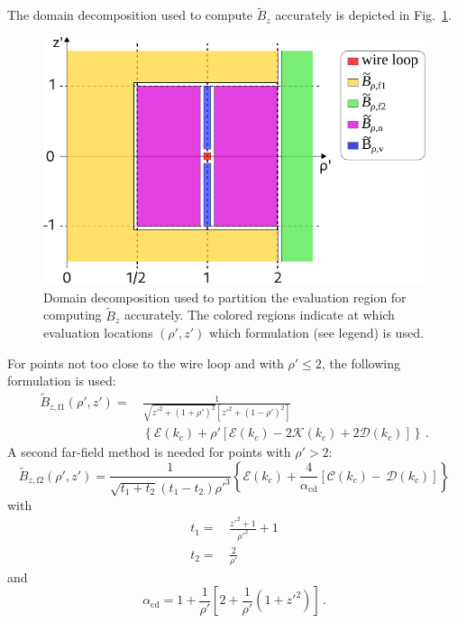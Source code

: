 The domain decomposition used to compute $\tilde{B}_z$ accurately is depicted in Fig.~\ref{fig:cwl_B_z_regions}.
\begin{figure}[htbp]
    \centering
    \includegraphics{img/cwl_B_z_regions.pdf}
    \caption{Domain decomposition used to partition the evaluation region
             for computing $\tilde{B}_z$ accurately.
             The colored regions indicate at which evaluation locations $(\rho',z')$
             which formulation (see legend) is used.}
    \label{fig:cwl_B_z_regions}
\end{figure}
For points not too close to the wire loop and with $\rho' \leq 2$, the following formulation is used:
\begin{align}
  \tilde{B}_{z,\mathrm{f1}} (\rho', z')
  =&\, \frac{1}{\sqrt{{z'}^2 + (1+\rho')^2} \left[{z'}^2 + (1 - \rho')^2 \right] } \nonumber \\
  ~&\,  \left\{ \mathcal{E}(k_c) + \rho' \left[ \mathcal{E}(k_c) - 2 \mathcal{K}(k_c) + 2 \mathcal{D}(k_c) \right] \right\} \, . \label{eqn:cwl_B_z_f1}
\end{align}
A second far-field method is needed for points with $\rho' > 2$:
\begin{equation}
  \tilde{B}_{z,\mathrm{f2}} (\rho', z')
  = \frac{1}{\sqrt{t_1 + t_2}(t_1-t_2) {\rho'}^3}
    \left\{ \mathcal{E}(k_c) + \frac{4}{\alpha_\mathrm{cd}} \left[ \mathcal{C}(k_c) - \,\mathcal{D}(k_c) \right] \right\} \label{eqn:cwl_B_z_f2}
\end{equation}
with
\begin{align}
  t_1 =&\, \frac{z'^2 + 1}{\rho'^2} + 1 \\
  t_2 =&\, \frac{2}{\rho'}
\end{align}
and
\begin{equation}
  \alpha_\mathrm{cd} = 1 + \frac{1}{\rho'} \left[ 2 + \frac{1}{\rho'} \left( 1 + {z'}^2 \right) \right] \, .
\end{equation}
